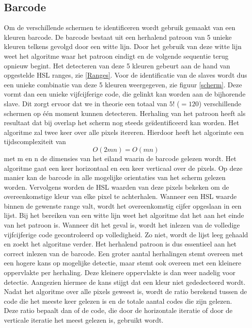  \subsection{Barcode} \label{barcode}
Om de verschillende schermen te identificeren wordt gebruik gemaakt van een kleuren barcode. De barcode bestaat uit een herhalend patroon van 5 unieke kleuren telkens gevolgd door een witte lijn. Door het gebruik van deze witte lijn weet het algoritme waar het patroon eindigt en de volgende sequentie terug opnieuw begint. Het detecteren van deze 5 kleuren gebeurt aan de hand van opgestelde HSL ranges, zie \ref{Ranges}. Voor de identificatie van de slaves wordt dus een unieke combinatie van deze 5 kleuren weergegeven, zie figuur \ref{scherm}. Deze vormt dan een unieke vijfcijferige code, die gelinkt kan worden aan de bijhorende slave. Dit zorgt ervoor dat we in theorie een totaal van $5!$ ($=120$) verschillende schermen op één moment kunnen detecteren. Herhaling van het patroon heeft als resultaat dat bij overlap het scherm nog steeds geïdentificeerd kan worden. Het algoritme zal twee keer over alle pixels itereren. Hierdoor heeft het algorimte een tijdscomplexiteit van
\[O(2mn)=O(mn)\]
met m en n de dimensies van het eiland waarin de barcode gelezen wordt. Het algoritme gaat een keer horizontaal en een keer verticaal over de pixels. Op deze manier kan de barcode in alle mogelijke orientaties van het scherm gelezen worden. Vervolgens worden de HSL waarden van deze pixels bekeken om de overeenkomstige kleur van elke pixel te achterhalen. Wanneer een HSL waarde binnen de gewenste range valt, wordt het overeenkomstig cijfer opgeslaan in een lijst. Bij het bereiken van een witte lijn weet het algoritme dat het aan het einde van het patroon is. Wanneer dit het geval is, wordt het inlezen van de volledige vijfcijferige code gecontroleerd op volledigheid. Zo niet, wordt de lijst leeg gehaald en zoekt het algoritme verder. Het herhalend patroon is dus essentieel aan het correct inlezen van de barcode. Een groter aantal herhalingen stemt overeen met een hogere kans op mogelijke detectie, maar stemt ook overeen met een kleinere oppervlakte per herhaling. Deze kleinere oppervlakte is dan weer nadelig voor detectie. Aangezien hiermee de kans stijgt dat een kleur niet gededecteerd wordt. Nadat het algoritme over alle pixels geweest is, wordt de ratio berekend tussen de code die het meeste keer gelezen is en de totale aantal codes die zijn gelezen. Deze ratio bepaalt dan of de code, die door de horizontale iteratie of door de verticale iteratie het meest gelezen is, gebruikt wordt.

